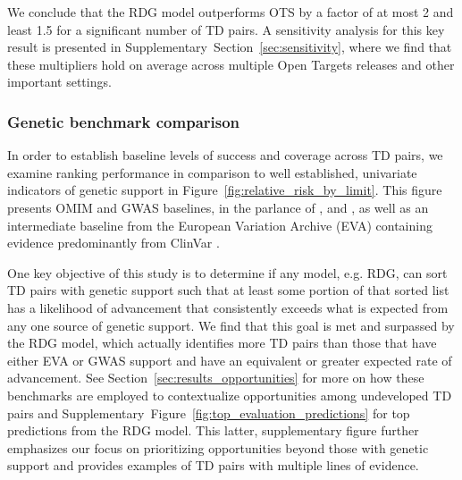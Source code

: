 \documentclass{article}
\begin{document}
We conclude that the RDG model outperforms OTS by a factor of at most 2 and least 1.5 for a significant number of TD pairs. A sensitivity analysis for this key result is presented in Supplementary~Section~\ref{sec:sensitivity}, where we find that these multipliers hold on average across multiple Open Targets releases and other important settings.

\subsubsection{Genetic benchmark comparison}

In order to establish baseline levels of success and coverage across TD pairs, we examine ranking performance in comparison to well established, univariate indicators of genetic support in Figure~\ref{fig:relative_risk_by_limit}. This figure presents OMIM and GWAS baselines, in the parlance of \cite{King2019-rc}, \cite{Nelson2015-eg} and \cite{Minikel2023.06.23.23291765}, as well as an intermediate baseline from the European Variation Archive (EVA) \cite{PMID:34718739} containing evidence predominantly from ClinVar \cite{PMID:24234437}.

One key objective of this study is to determine if any model, e.g. RDG, can sort TD pairs with genetic support such that at least some portion of that sorted list has a likelihood of advancement that consistently exceeds what is expected from any one source of genetic support. We find that this goal is met and surpassed by the RDG model, which actually identifies more TD pairs than those that have either EVA or GWAS support and have an equivalent or greater expected rate of advancement. See Section~\ref{sec:results_opportunities} for more on how these benchmarks are employed to contextualize opportunities among undeveloped TD pairs and Supplementary~Figure~\ref{fig:top_evaluation_predictions} for top predictions from the RDG model. This latter, supplementary figure further emphasizes our focus on prioritizing opportunities beyond those with genetic support and provides examples of TD pairs with multiple lines of evidence.
\end{document}
